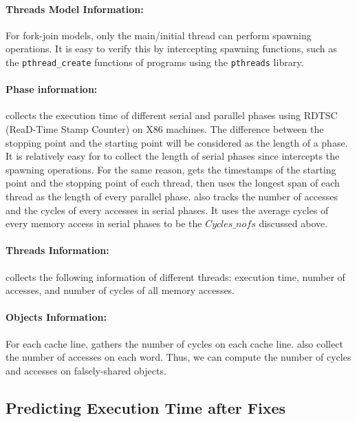 \paragraph{Threads Model Information:} For fork-join models, only the main/initial thread can perform spawning operations. It is easy to verify this by intercepting spawning functions, such as the \texttt{pthread\_create} functions of programs using the \texttt{pthreads} library. 

\paragraph{Phase information:} \Cheetah{} collects the execution time of different serial and parallel phases using RDTSC (ReaD-Time Stamp Counter) on X86 machines.  The difference between the stopping point and the starting point will be considered as the length of a phase. It is relatively easy for \cheetah{} to collect the length of serial phases since \cheetah{} intercepts the spawning operations. For the same reason, \cheetah{} gets the timestamps of the starting point and the stopping point of each thread, then uses the longest span of each thread as the length of every parallel phase. \Cheetah{} also tracks the number of accesses and the cycles of every accesses in serial phases. It uses the average cycles of every memory access in serial phases to be the $Cycles\_{nofs}$ discussed above.  
 
\paragraph{Threads Information:} \Cheetah{} collects the following information of different threads: execution time, number of accesses, and number of cycles of all memory accesses. 

\paragraph{Objects Information:}
For each cache line, \cheetah{} gathers the number of cycles on each cache line. \cheetah{} also collect the number of accesses on each word. Thus, we can compute the number of cycles and accesses on falsely-shared objects. 
 
\subsection{Predicting Execution Time after Fixes}
\label{sec:predicttime}

